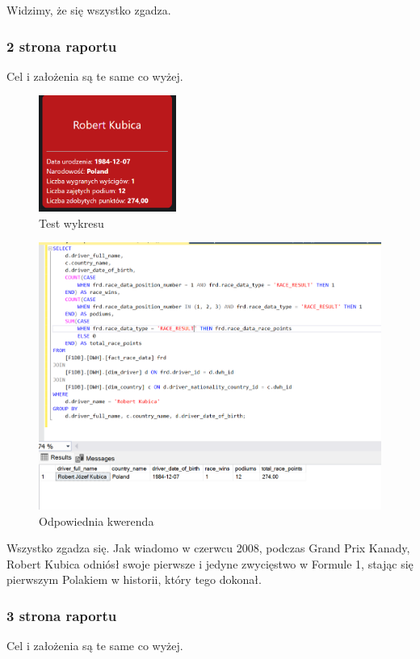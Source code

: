 \documentclass[12pt]{article}
\begin{document}
Widzimy, że się wszystko zgadza.

\subsubsection*{2 strona raportu}
Cel i założenia są te same co wyżej.

\begin{figure}[H]
    \centering   \includegraphics[width=0.4\textwidth]{t6.png}
    \caption{Test wykresu}
\end{figure}

\begin{figure}[H]
    \centering   \includegraphics[width=\textwidth]{t7.png}
    \caption{Odpowiednia kwerenda}
\end{figure}

Wszystko zgadza się. Jak wiadomo w czerwcu 2008, podczas Grand Prix Kanady, Robert Kubica odniósł swoje pierwsze i jedyne zwycięstwo w Formule 1, stając się pierwszym Polakiem w historii, który tego dokonał.


\subsubsection*{3 strona raportu}
Cel i założenia są te same co wyżej.
\end{document}
